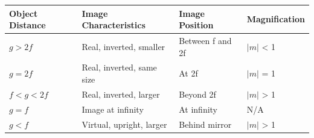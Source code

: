 \documentclass[
  a4paper,
]{book}
\begin{document}
\begin{longtable}[]{@{}
  >{\raggedright\arraybackslash}p{}
  >{\raggedright\arraybackslash}p{}
  >{\raggedright\arraybackslash}p{}
  >{\raggedright\arraybackslash}p{}@{}}
\toprule\noalign{}
\begin{minipage}[b]{\linewidth}\raggedright
Object Distance
\end{minipage} & \begin{minipage}[b]{\linewidth}\raggedright
Image Characteristics
\end{minipage} & \begin{minipage}[b]{\linewidth}\raggedright
Image Position
\end{minipage} & \begin{minipage}[b]{\linewidth}\raggedright
Magnification
\end{minipage} \\
\midrule\noalign{}
\endhead
\bottomrule\noalign{}
\endlastfoot
\(g > 2f\) & Real, inverted, smaller & Between f and 2f & \(|m|\)
\textless{} 1 \\
\(g = 2f\) & Real, inverted, same size & At 2f & \(|m|\) = 1 \\
\(f < g < 2f\) & Real, inverted, larger & Beyond 2f & \(|m|\)
\textgreater{} 1 \\
\(g = f\) & Image at infinity & At infinity & N/A \\
\(g < f\) & Virtual, upright, larger & Behind mirror & \(|m|\)
\textgreater{} 1 \\
\end{longtable}
\end{document}
